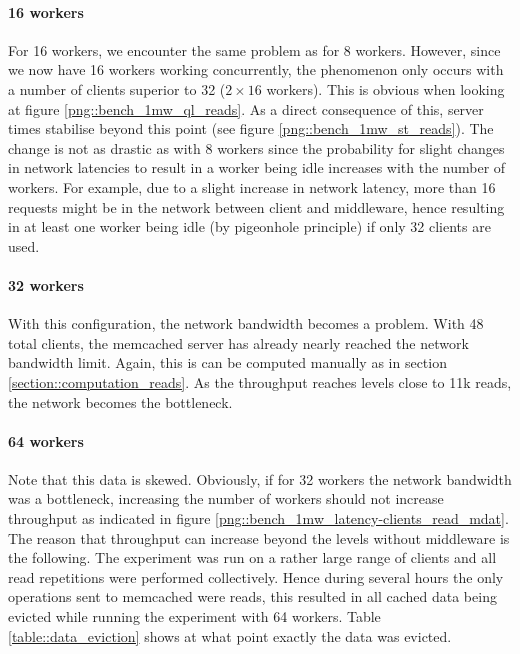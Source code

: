 \documentclass[11pt,a4paper]{article}
\begin{document}
\paragraph{16 workers}
For 16 workers, we encounter the same problem as for 8 workers. However, since we now have 16 workers working concurrently, the phenomenon only occurs with a number of clients superior to 32 ($2\times16$ workers). This is obvious when looking at figure \ref{png::bench_1mw_ql_reads}. As a direct consequence of this, server times stabilise beyond this point (see figure \ref{png::bench_1mw_st_reads}). The change is not as drastic as with 8 workers since the probability for slight changes in network latencies to result in a worker being idle increases with the number of workers. For example, due to a slight increase in network latency, more than 16 requests might be in the network between client and middleware, hence resulting in at least one worker being idle (by pigeonhole principle) if only 32 clients are used.

\paragraph{32 workers}
With this configuration, the network bandwidth becomes a problem. With 48 total clients, the memcached server has already nearly reached the network bandwidth limit. Again, this is can be computed manually as in section \ref{section::computation_reads}. As the throughput reaches levels close to 11k reads, the network becomes the bottleneck.

\paragraph{64 workers}
Note that this data is skewed. Obviously, if for 32 workers the network bandwidth was a bottleneck, increasing the number of workers should not increase throughput as indicated in figure \ref{png::bench_1mw_latency-clients_read_mdat}. The reason that throughput can increase beyond the levels without middleware is the following. The experiment was run on a rather large range of clients and all read repetitions were performed collectively. Hence during several hours the only operations sent to memcached were reads, this resulted in all cached data being evicted while running the experiment with 64 workers. Table \ref{table::data_eviction} shows at what point exactly the data was evicted.
\end{document}
